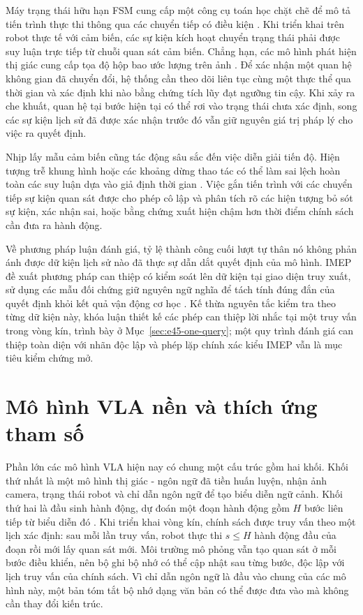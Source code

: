 Máy trạng thái hữu hạn FSM cung cấp một công cụ toán học chặt chẽ để mô tả tiến trình thực thi thông qua các chuyển tiếp có điều kiện \cite{rewardmachines2018}. Khi triển khai trên robot thực tế với cảm biến, các sự kiện kích hoạt chuyển trạng thái phải được suy luận trực tiếp từ chuỗi quan sát cảm biến. Chẳng hạn, các mô hình phát hiện thị giác cung cấp tọa độ hộp bao ước lượng trên ảnh \cite{groundingdino2024}. Để xác nhận một quan hệ không gian đã chuyển đổi, hệ thống cần theo dõi liên tục cùng một thực thể qua thời gian và xác định khi nào bằng chứng tích lũy đạt ngưỡng tin cậy. Khi xảy ra che khuất, quan hệ tại bước hiện tại có thể rơi vào trạng thái chưa xác định, song các sự kiện lịch sử đã được xác nhận trước đó vẫn giữ nguyên giá trị pháp lý cho việc ra quyết định.

Nhịp lấy mẫu cảm biến cũng tác động sâu sắc đến việc diễn giải tiến độ. Hiện tượng trễ khung hình hoặc các khoảng dừng thao tác có thể làm sai lệch hoàn toàn các suy luận dựa vào giả định thời gian \cite{clockvla2026}. Việc gắn tiến trình với các chuyển tiếp sự kiện quan sát được cho phép cô lập và phân tích rõ các hiện tượng bỏ sót sự kiện, xác nhận sai, hoặc bằng chứng xuất hiện chậm hơn thời điểm chính sách cần đưa ra hành động.

Về phương pháp luận đánh giá, tỷ lệ thành công cuối lượt tự thân nó không phản ánh được dữ kiện lịch sử nào đã thực sự dẫn dắt quyết định của mô hình. IMEP đề xuất phương pháp can thiệp có kiểm soát lên dữ kiện tại giao diện truy xuất, sử dụng các mẫu đối chứng giữ nguyên ngữ nghĩa để tách tính đúng đắn của quyết định khỏi kết quả vận động cơ học \cite{imep2026}. Kế thừa nguyên tắc kiểm tra theo từng dữ kiện này, khóa luận thiết kế các phép can thiệp lời nhắc tại một truy vấn trong vòng kín, trình bày ở Mục~\ref{sec:e45-one-query}; một quy trình đánh giá can thiệp toàn diện với nhãn độc lập và phép lặp chính xác kiểu IMEP vẫn là mục tiêu kiểm chứng mở.

\section{Mô hình VLA nền và thích ứng tham số}
\label{sec:vla-backbones}

Phần lớn các mô hình VLA hiện nay có chung một cấu trúc gồm hai khối. Khối thứ nhất là một mô hình thị giác - ngôn ngữ đã tiền huấn luyện, nhận ảnh camera, trạng thái robot và chỉ dẫn ngôn ngữ để tạo biểu diễn ngữ cảnh. Khối thứ hai là đầu sinh hành động, dự đoán một đoạn hành động gồm $H$ bước liên tiếp từ biểu diễn đó \cite{rt22023,openvla2024,octo2024}. Khi triển khai vòng kín, chính sách được truy vấn theo một lịch xác định: sau mỗi lần truy vấn, robot thực thi $s \le H$ hành động đầu của đoạn rồi mới lấy quan sát mới. Môi trường mô phỏng vẫn tạo quan sát ở mỗi bước điều khiển, nên bộ ghi bộ nhớ có thể cập nhật sau từng bước, độc lập với lịch truy vấn của chính sách. Vì chỉ dẫn ngôn ngữ là đầu vào chung của các mô hình này, một bản tóm tắt bộ nhớ dạng văn bản có thể được đưa vào mà không cần thay đổi kiến trúc.

